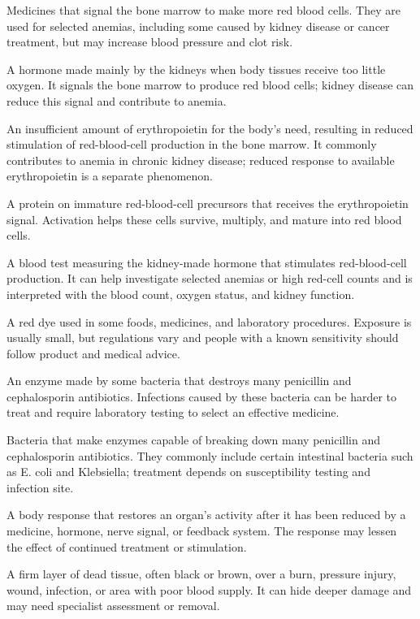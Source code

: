  Medicines that signal the bone marrow to make more red blood cells. They are used for selected anemias, including some caused by kidney disease or cancer treatment, but may increase blood pressure and clot risk.

 A hormone made mainly by the kidneys when body tissues receive too little oxygen. It signals the bone marrow to produce red blood cells; kidney disease can reduce this signal and contribute to anemia.

 An insufficient amount of erythropoietin for the body's need, resulting in reduced stimulation of red-blood-cell production in the bone marrow. It commonly contributes to anemia in chronic kidney disease; reduced response to available erythropoietin is a separate phenomenon.

 A protein on immature red-blood-cell precursors that receives the erythropoietin signal. Activation helps these cells survive, multiply, and mature into red blood cells.

 A blood test measuring the kidney-made hormone that stimulates red-blood-cell production. It can help investigate selected anemias or high red-cell counts and is interpreted with the blood count, oxygen status, and kidney function.

 A red dye used in some foods, medicines, and laboratory procedures. Exposure is usually small, but regulations vary and people with a known sensitivity should follow product and medical advice.

 An enzyme made by some bacteria that destroys many penicillin and cephalosporin antibiotics. Infections caused by these bacteria can be harder to treat and require laboratory testing to select an effective medicine.

 Bacteria that make enzymes capable of breaking down many penicillin and cephalosporin antibiotics. They commonly include certain intestinal bacteria such as E. coli and Klebsiella; treatment depends on susceptibility testing and infection site.

 A body response that restores an organ’s activity after it has been reduced by a medicine, hormone, nerve signal, or feedback system. The response may lessen the effect of continued treatment or stimulation.

 A firm layer of dead tissue, often black or brown, over a burn, pressure injury, wound, infection, or area with poor blood supply. It can hide deeper damage and may need specialist assessment or removal.

